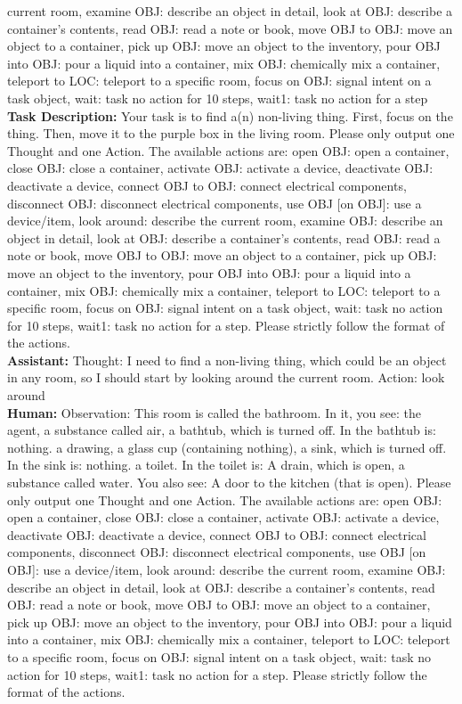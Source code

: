 \begin{tcolorbox}[breakable,title=Few-shot Prompt for LLMs Directly Serving as ScienceWorld Reward Model]
\textcolor{my_blue!50}{current room, examine OBJ: describe an object in detail, look at OBJ: describe a container's contents, read OBJ: read a note or book, move OBJ to OBJ: move an object to a container, pick up OBJ: move an object to the inventory, pour OBJ into OBJ: pour a liquid into a container, mix OBJ: chemically mix a container, teleport to LOC: teleport to a specific room, focus on OBJ: signal intent on a task object, wait: task no action for 10 steps, wait1: task no action for a step\\}
\textcolor{my_blue!50}{\textbf{Task Description:} Your task is to find a(n) non-living thing. First, focus on the thing. Then, move it to the purple box in the living room. Please only output one Thought and one Action. The available actions are: open OBJ: open a container, close OBJ: close a container, activate  OBJ: activate a device, deactivate OBJ: deactivate a device, connect OBJ to OBJ: connect electrical components, disconnect OBJ: disconnect electrical components, use OBJ [on OBJ]: use a device/item, look around: describe the current room, examine OBJ: describe an object in detail, look at OBJ: describe a container's contents, read OBJ: read a note or book, move OBJ to OBJ: move an object to a container, pick up OBJ: move an object to the inventory, pour OBJ into OBJ: pour a liquid into a container, mix OBJ: chemically mix a container, teleport to LOC: teleport to a specific room, focus on OBJ: signal intent on a task object, wait: task no action for 10 steps, wait1: task no action for a step. Please strictly follow the format of the actions.
}\\
\textcolor{my_purple}{
\textbf{Assistant: }
Thought: I need to find a non-living thing, which could be an object in any room, so I should start by looking around the current room. Action: look around
}\\
\textcolor{my_blue!50}{
\textbf{Human: }Observation: This room is called the bathroom. In it, you see: the agent, a substance called air, a bathtub, which is turned off. In the bathtub is: nothing. a drawing, a glass cup (containing nothing), a sink, which is turned off. In the sink is: nothing. a toilet. In the toilet is: A drain, which is open, a substance called water. You also see: A door to the kitchen (that is open). Please only output one Thought and one Action. The available actions are: open OBJ: open a container, close OBJ: close a container, activate OBJ: activate a device, deactivate OBJ: deactivate a device, connect OBJ to OBJ: connect electrical components, disconnect OBJ: disconnect electrical components, use OBJ [on OBJ]: use a device/item, look around: describe the current room, examine OBJ: describe an object in detail, look at OBJ: describe a container's contents, read OBJ: read a note or book, move OBJ to OBJ: move an object to a container, pick up OBJ: move an object to the inventory, pour OBJ into OBJ: pour a liquid into a container, mix OBJ: chemically mix a container, teleport to LOC: teleport to a specific room, focus on OBJ: signal intent on a task object, wait: task no action for 10 steps, wait1: task no action for a step. Please strictly follow the format of the actions.
}
\end{tcolorbox}
